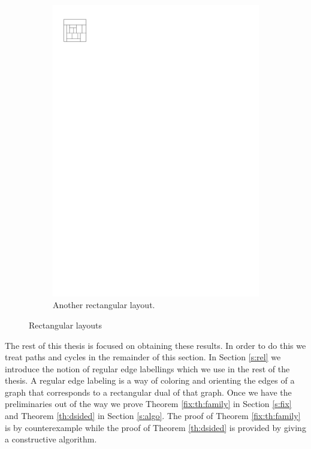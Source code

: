 \begin{figure}[b]
\begin{subfigure}[b]{0.45 \textwidth}
        \includegraphics[scale=1]{rectangularDuals/img/vertonesided}
        \caption{Another rectangular layout.}
        \label{fig:intr:vertonesided}
      \end{subfigure}
      \caption{Rectangular layouts}
      \label{fig:intr:graphs}
  \end{figure}

  The rest of this thesis is focused on obtaining these results.
  In order to do this we treat paths and cycles in the remainder of this section. In Section \ref{s:rel} we introduce the notion of regular edge labellings which we use in the rest of the thesis. A regular edge labeling is a way of coloring and orienting the edges of a graph that corresponds to a rectangular dual of that graph.
  Once we have the preliminaries out of the way we prove Theorem \ref{fix:th:family} in Section \ref{s:fix} and Theorem \ref{th:dsided} in Section \ref{s:algo}. The proof of Theorem \ref{fix:th:family} is by counterexample while the proof of Theorem \ref{th:dsided} is provided by giving a constructive algorithm.
